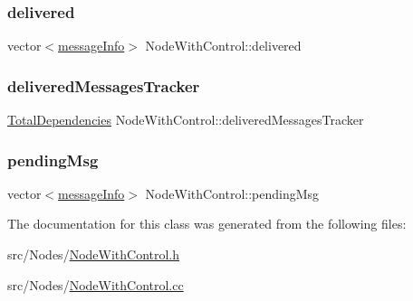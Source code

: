 \subsubsection{\texorpdfstring{delivered}{delivered}}
{\footnotesize\ttfamily vector$<$\hyperlink{structures_8h_a7e7bdc1d2fff8a9436f2f352b2711ed6}{message\+Info}$>$ Node\+With\+Control\+::delivered\hspace{0.3cm}{\ttfamily [protected]}}

\mbox{\label{class_node_with_control_a6c868fa52cca68f650dca96a788475df}} 
\subsubsection{\texorpdfstring{delivered\+Messages\+Tracker}{deliveredMessagesTracker}}
{\footnotesize\ttfamily \hyperlink{class_total_dependencies}{Total\+Dependencies} Node\+With\+Control\+::delivered\+Messages\+Tracker\hspace{0.3cm}{\ttfamily [protected]}}

\mbox{\label{class_node_with_control_af38ffbedc82038536c77314f22ea6b57}} 
\subsubsection{\texorpdfstring{pending\+Msg}{pendingMsg}}
{\footnotesize\ttfamily vector$<$\hyperlink{structures_8h_a7e7bdc1d2fff8a9436f2f352b2711ed6}{message\+Info}$>$ Node\+With\+Control\+::pending\+Msg\hspace{0.3cm}{\ttfamily [protected]}}



The documentation for this class was generated from the following files\+:\begin{DoxyCompactItemize}
\item 
src/\+Nodes/\hyperlink{_node_with_control_8h}{Node\+With\+Control.\+h}\item 
src/\+Nodes/\hyperlink{_node_with_control_8cc}{Node\+With\+Control.\+cc}\end{DoxyCompactItemize}

